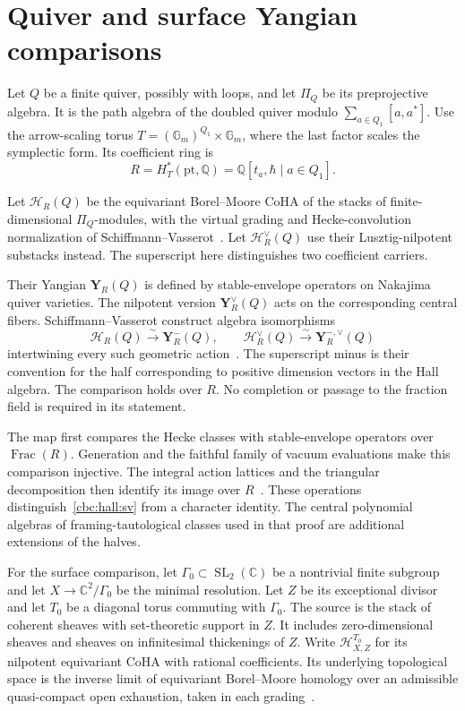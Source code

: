 \section{Quiver and surface Yangian comparisons}
Let $Q$ be a finite quiver, possibly with loops, and let $\Pi_Q$ be its preprojective algebra.
It is the path algebra of the doubled quiver modulo $\sum_{a\in Q_1}[a,a^*]$.
Use the arrow-scaling torus
$T=(\mathbb G_m)^{Q_1}\times\mathbb G_m$, where the last factor scales the symplectic form.
Its coefficient ring is
\[
 R=H_T^*(\mathrm{pt},\mathbb Q)
     =\mathbb Q[t_a,\hbar\mid a\in Q_1].
\]

Let $\mathcal H_R(Q)$ be the equivariant Borel--Moore CoHA of the stacks of finite-dimensional $\Pi_Q$-modules, with the virtual grading and Hecke-convolution normalization of Schiffmann--Vasserot~\cite[\S2]{SVYangians}.
Let $\mathcal H_R^\vee(Q)$ use their Lusztig-nilpotent substacks instead.
The superscript here distinguishes two coefficient carriers.

Their Yangian $\mathbf Y_R(Q)$ is defined by stable-envelope operators on Nakajima quiver varieties.
The nilpotent version $\mathbf Y_R^\vee(Q)$ acts on the corresponding central fibers.
Schiffmann--Vasserot construct algebra isomorphisms
\begin{equation}\label{cbc:hall:sv}
 \mathcal H_R(Q)\xrightarrow{\sim}\mathbf Y_R^-(Q),
 \qquad
 \mathcal H_R^\vee(Q)\xrightarrow{\sim}\mathbf Y_R^{-,\vee}(Q)
\end{equation}
intertwining every such geometric action~\cite[Theorem~4.13]{SVYangians}.
The superscript minus is their convention for the half corresponding to positive dimension vectors in the Hall algebra.
The comparison holds over $R$.
No completion or passage to the fraction field is required in its statement.

The map first compares the Hecke classes with stable-envelope operators over $\operatorname{Frac}(R)$.
Generation and the faithful family of vacuum evaluations make this comparison injective.
The integral action lattices and the triangular decomposition then identify its image over $R$~\cite[Proposition~4.1, Theorem~4.8 and Proposition~4.10]{SVYangians}.
These operations distinguish~\eqref{cbc:hall:sv} from a character identity.
The central polynomial algebras of framing-tautological classes used in that proof are additional extensions of the halves.

For the surface comparison, let $\Gamma_0\subset\operatorname{SL}_2(\mathbb C)$ be a nontrivial finite subgroup and let
$X\to\mathbb C^2/\Gamma_0$ be the minimal resolution.
Let $Z$ be its exceptional divisor and let $T_0$ be a diagonal torus commuting with $\Gamma_0$.
The source is the stack of coherent sheaves with set-theoretic support in $Z$.
It includes zero-dimensional sheaves and sheaves on infinitesimal thickenings of $Z$.
Write $\mathcal H^{T_0}_{X,Z}$ for its nilpotent equivariant CoHA with rational coefficients.
Its underlying topological space is the inverse limit of equivariant Borel--Moore homology over an admissible quasi-compact open exhaustion, taken in each grading~\cite[\S III.7.2]{DPPSSV}.

